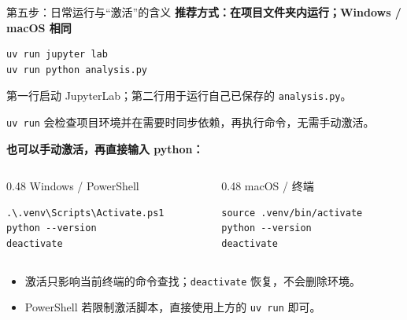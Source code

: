 \documentclass[9pt]{ctexbeamer}
\begin{document}
\begin{frame}[fragile]{第五步：日常运行与“激活”的含义}
  \textbf{推荐方式：在项目文件夹内运行；Windows / macOS 相同}
\begin{lstlisting}[language={},numbers=none]
uv run jupyter lab
uv run python analysis.py
\end{lstlisting}
  {\small 第一行启动 JupyterLab；第二行用于运行自己已保存的 \texttt{analysis.py}。\par
  \texttt{uv run} 会检查项目环境并在需要时同步依赖，再执行命令，无需手动激活。\par}
  \vspace{0.15cm}
  \textbf{也可以手动激活，再直接输入 python：}
  \begin{columns}[T,totalwidth=\textwidth]
    \begin{column}{0.48\textwidth}
      Windows / PowerShell
\begin{lstlisting}[language={},numbers=none]
.\.venv\Scripts\Activate.ps1
python --version
deactivate
\end{lstlisting}
    \end{column}
    \begin{column}{0.48\textwidth}
      macOS / 终端
\begin{lstlisting}[language={},numbers=none]
source .venv/bin/activate
python --version
deactivate
\end{lstlisting}
    \end{column}
  \end{columns}
  \begin{itemize}
    \item 激活只影响当前终端的命令查找；\texttt{deactivate} 恢复，不会删除环境。
    \item PowerShell 若限制激活脚本，直接使用上方的 \texttt{uv run} 即可。
  \end{itemize}
\end{frame}
\end{document}
